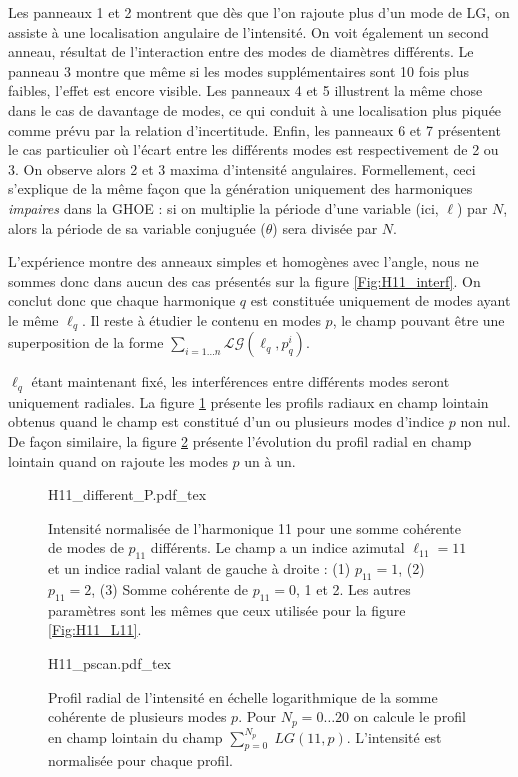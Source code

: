 Les panneaux 1 et 2 montrent que dès que l'on rajoute plus d'un mode de LG, on assiste à une localisation angulaire de l'intensité. On voit également un second anneau, résultat de l'interaction entre des modes de diamètres différents. Le panneau 3 montre que même si les modes supplémentaires sont 10 fois plus faibles, l'effet est encore visible. Les panneaux 4 et 5 illustrent la même chose dans le cas de davantage de modes, ce qui conduit à une localisation plus piquée comme prévu par la relation d'incertitude. Enfin, les panneaux 6 et 7 présentent le cas particulier où l'écart entre les différents modes est respectivement de 2 ou 3. On observe alors 2 et 3 maxima d'intensité angulaires. Formellement, ceci s'explique de la même façon que la génération uniquement des harmoniques \textit{impaires} dans la GHOE : si on multiplie la période d'une variable (ici, $\ell$) par $N$, alors la période de sa variable conjuguée ($\theta$) sera divisée par $N$.

L'expérience montre des anneaux simples et homogènes avec l'angle, nous ne sommes donc dans aucun des cas présentés sur la figure \ref{Fig:H11_interf}. On conclut donc que chaque harmonique $q$ est constituée uniquement de modes ayant le même $\ell_{q}$. Il reste à étudier le contenu en modes $p$, le champ pouvant être une superposition de la forme $\sum_{i=1\ldots n}\mathcal{LG}(\ell_q,p_q^i)$.

$\ell_q$ étant maintenant fixé, les interférences entre différents modes seront uniquement radiales. 
La figure \ref{Fig:H11_pmodes} présente les profils radiaux en champ lointain obtenus quand le champ est constitué d'un ou plusieurs modes d'indice $p$ non nul. De façon similaire, la figure \ref{Fig:H11_pscan} présente l'évolution du profil radial en champ lointain quand on rajoute les modes $p$ un à un.


\begin{figure}[!ht]
\centering
\def\svgwidth{\columnwidth}
{H11_different_P.pdf_tex}
\caption{Intensité normalisée de l'harmonique 11 pour une somme cohérente de modes de $p_{11}$ différents. Le champ a un indice azimutal $\ell_{11} = 11$ et un indice radial valant de gauche à droite : (1) $p_{11} = 1$, (2) $p_{11} = 2$, (3) Somme cohérente de $p_{11} = 0$, 1 et 2. Les autres paramètres sont les mêmes que ceux utilisée pour la figure \ref{Fig:H11_L11}.}
\label{Fig:H11_pmodes}
\end{figure}

\begin{figure}[!ht]
\centering
\def\svgwidth{\columnwidth}
{H11_pscan.pdf_tex}
\caption{Profil radial de l'intensité en échelle logarithmique de la somme cohérente de plusieurs modes $p$. Pour $N_p=0\ldots20$ on calcule le profil en champ lointain du champ $\sum_{p=0}^{N_p}\; LG(11,p)$. L'intensité est normalisée pour chaque profil.}
\label{Fig:H11_pscan}
\end{figure}

